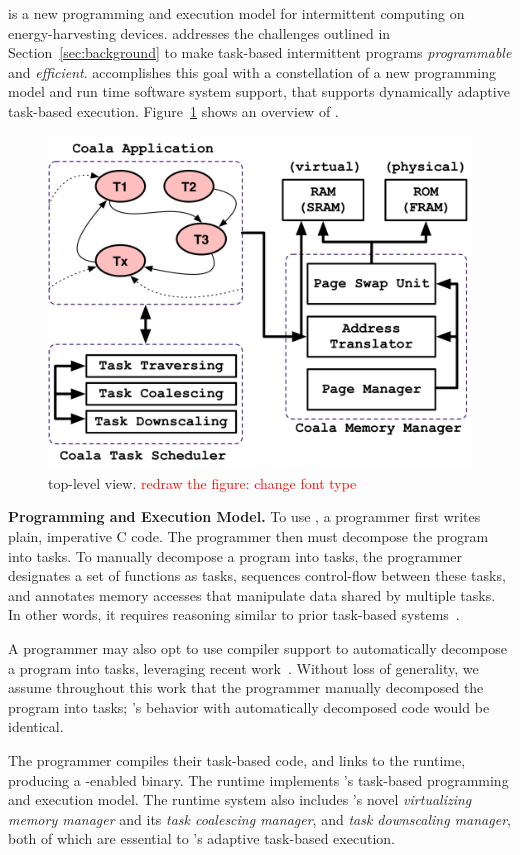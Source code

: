 \sys is a new programming and execution model for intermittent computing on energy-harvesting devices. \sys addresses the challenges outlined in Section~\ref{sec:background} to make task-based intermittent programs {\em programmable} and {\em efficient}. \sys accomplishes this goal with a constellation of a new programming model and run time software system support, that supports dynamically adaptive task-based execution. Figure~\ref{fig:system_overview} shows an overview of \sys.

\begin{figure}
	\centering
	\includegraphics[width=0.5\columnwidth]{figures/graffle/overview.pdf}
	\caption{\sys top-level view. \textcolor{red}{redraw the figure: change font type}}
	\label{fig:system_overview}
\end{figure}

\textbf{\sys Programming and Execution Model.}  To use \sys, a programmer first writes plain, imperative C code. The programmer then must decompose the program into tasks. To manually decompose a program into tasks, the programmer designates a set of functions as tasks, sequences control-flow between these tasks, and annotates memory accesses that manipulate data shared by multiple tasks. In other words, it requires reasoning similar to prior task-based systems~\cite{chain,alpaca}. 

A programmer may also opt to use compiler support to automatically decompose a program into tasks, leveraging recent work~\cite{cleancut_2018,baghsorkhi_cgo_2018}. Without loss of generality, we assume throughout this work that the programmer manually decomposed the program into tasks; \sys's behavior with automatically decomposed code would be identical.

The programmer compiles their task-based code, and links to the \sys runtime, producing a \sys-enabled binary. The \sys runtime implements \sys's task-based programming and execution model. The runtime system also includes \sys's novel {\em virtualizing memory manager} and its {\em task coalescing manager}, and {\em task downscaling manager}, both of which are essential to \sys's adaptive task-based execution.

